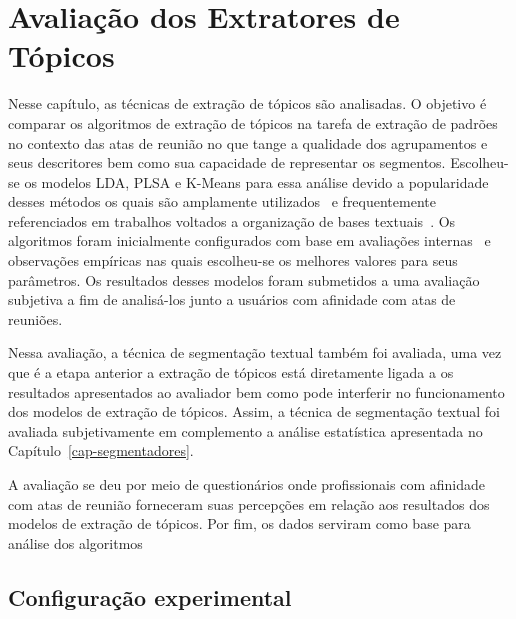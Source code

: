 \chapter{Avaliação dos Extratores de Tópicos}\label{cap-extratores}


Nesse capítulo, as técnicas de extração de tópicos são analisadas. O objetivo é comparar os algoritmos de extração de tópicos na tarefa de extração de padrões no contexto das atas de reunião no que tange a qualidade dos agrupamentos e seus descritores bem como sua capacidade de representar os segmentos. Escolheu-se os modelos LDA, PLSA e K-Means para essa análise devido a popularidade desses métodos os quais são amplamente utilizados~\cite{DZhu20122} e frequentemente referenciados em trabalhos voltados a organização de bases textuais~\cite{Aggarwal2018, OCallaghan2015, Steyvers2007}.
Os algoritmos foram inicialmente configurados com base em avaliações internas~\cite{Hassani2017} e observações empíricas nas quais escolheu-se os melhores valores para seus parâmetros. Os resultados desses modelos foram submetidos a uma avaliação subjetiva a fim de analisá-los junto a usuários com afinidade com atas de reuniões. 

Nessa avaliação, a técnica de segmentação textual também foi avaliada, uma vez que é a etapa anterior a extração de tópicos está diretamente ligada a os resultados apresentados ao avaliador bem como pode interferir no funcionamento dos modelos de extração de tópicos. Assim, a técnica de segmentação textual foi avaliada subjetivamente em complemento a análise estatística apresentada no Capítulo~\ref{cap-segmentadores}.

A avaliação se deu por meio de questionários onde profissionais com afinidade com atas de reunião forneceram suas percepções em relação aos resultados dos modelos de extração de tópicos. Por fim, os dados serviram como base para análise dos algoritmos 


\section{Configuração experimental}

